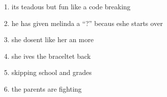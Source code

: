 \begin{enumerate}
\item its teadous but fun like a code breaking
\item he has given melinda a ``?'' becaus eshe starts over
\item she dosent like her an more
\item she ives the braceltet back
\item skipping school and grades
\item the parents are fighting
\end{enumerate}



